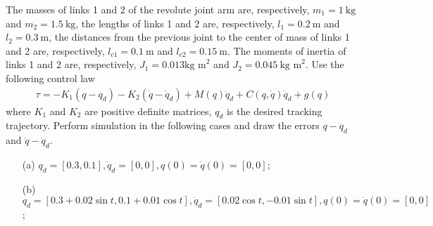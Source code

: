 \documentclass[a4paper,11pt]{article}
\begin{document}
\begin{enumerate}
The masses of links 1 and 2 of the
revolute joint arm are, respectively, $m_{1}=1~\mbox{kg}$
and $m_{2}=1.5~\mbox{kg}$, the lengths of links 1 and 2 are, respectively,
$l_{1}=0.2~\mbox{m}$ and $l_{2}=0.3~\mbox{m}$, the
distances from the previous joint to the center of mass of links 1
and 2 are, respectively,
$l_{c1}=0.1~\mbox{m}$ and $l_{c2}=0.15~\mbox{m}$. The moments of inertia of links 1 and 2 are,
respectively, $J_1=0.013\mbox{kg m}^2$ and $J_2=0.045~\mbox{kg m}^2$. Use the following control law
\begin{align}
\tau=-K_1(q-q_d)-K_2(\dot q - \dot q_d) + M(q)\ddot q_d +C(q,\dot q)\dot q_d+g(q)
\end{align}
where $K_1$ and $K_2$ are positive definite matrices, $q_d$ is the desired tracking trajectory. Perform simulation in the following cases and draw the errors $q-q_d$ and $\dot q-\dot q_d$.
\begin{itemize}
  \item[(a)] $q_d=[0.3, 0.1], \dot q_d=[0, 0], q(0)=\dot q(0) =[0, 0]$;
  \item[(b)] $q_d=[0.3+0.02\sin t, 0.1+0.01\cos t], \dot q_d =[0.02\cos t, -0.01\sin t], q(0)=\dot q(0) =[0,0]$;
\end{itemize}
\end{enumerate}

%
%
\end{document}
